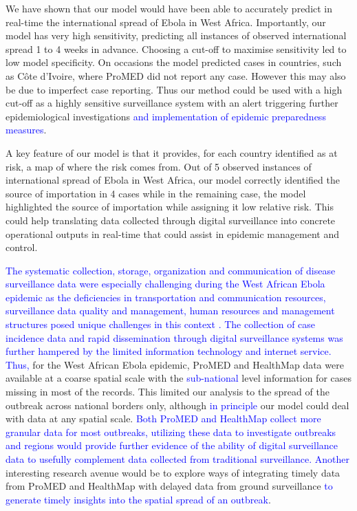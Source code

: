 \documentclass[9pt,twocolumn,twoside,lineno]{pnas-new}
\newcommand{\sangeeta}[1]{\textcolor{blue}{#1}}
\begin{document}
We have shown that our model would have been
able to accurately predict in real-time the international spread of
Ebola in West Africa. Importantly, our
model has very high sensitivity, predicting all instances of observed
international spread 1 to 4 weeks in advance. Choosing a cut-off to
maximise sensitivity led to low model specificity. On occasions the
model predicted cases in countries, such as Côte d'Ivoire, where
ProMED did not report any case.
However this may also be due to imperfect case reporting. Thus our
method could be used with a high cut-off as a highly sensitive
surveillance system with an alert triggering further epidemiological
investigations \sangeeta{and implementation of epidemic preparedness measures}. 

A key feature of our model is that it
provides, for each country identified as at risk, a map of where the
risk comes from. Out of 5 observed instances of international spread
of Ebola in West Africa, our model correctly identified the source
of importation in 4 cases while in the remaining case, the model
highlighted the source of importation while assigning it low relative
risk. This could help translating data collected through
digital surveillance into concrete operational outputs in real-time
that could assist in epidemic management and control. 

\sangeeta{The systematic collection, storage, organization and communication 
of disease surveillance data were especially challenging during the 
West African Ebola epidemic as the 
deficiencies in transportation and communication resources, 
surveillance data quality and management, human resources and 
management structures posed unique challenges in this context \cite{boland2017overcoming}.
The collection of case
incidence data and rapid dissemination through digital surveillance
systems was further hampered by the limited information technology and internet 
service. Thus, }
for the West African Ebola epidemic, ProMED and HealthMap data were
available at a coarse spatial scale with the \sangeeta{sub-national} level information
for cases missing in most of the records. This limited our analysis to
the spread of the outbreak across national borders only, although
\sangeeta{in principle} our
model could deal with data at any spatial scale. \sangeeta{Both ProMED and HealthMap
collect more granular data for most outbreaks, utilizing these data
to investigate outbreaks and regions would provide further evidence of
the ability of digital surveillance data to usefully complement data
collected from traditional
surveillance. Another}  interesting research
avenue would be to explore ways of integrating
timely data from ProMED and HealthMap with delayed data from ground
surveillance \sangeeta{ to generate timely insights into the spatial spread
  of an outbreak}.
\end{document}
